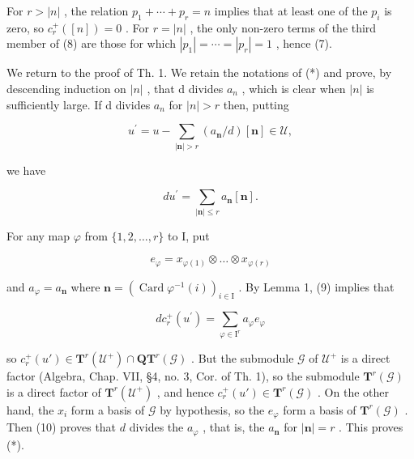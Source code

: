 For \(r > |n|\) , the relation \(p_{1} + \cdots + p_{r} = n\) implies that at least one of the \(p_{i}\) is zero, so \(c_{r}^{+}([n]) = 0\) . For \(r = |n|\) , the only non-zero terms of the third member of (8) are those for which \(|p_{1}| = \cdots = |p_{r}| = 1\) , hence (7).

We return to the proof of Th. 1. We retain the notations of (*) and prove, by descending induction on \(|n|\) , that d divides \(a_{n}\) , which is clear when \(|n|\) is sufficiently large. If d divides \(a_{n}\) for \(|n| > r\) then, putting

\[
u ^ {\prime} = u - \sum_ {| \mathbf {n} | > r} (a _ {\mathbf {n}} / d) [ \mathbf {n} ] \in \mathcal {U},
\]

we have

\[
d u ^ {\prime} = \sum_ {| \mathbf {n} | \leq r} a _ {\mathbf {n}} [ \mathbf {n} ].\tag{9}
\]

For any map \(\varphi\) from \(\{1,2,\ldots,r\}\) to I, put

\[
e _ {\varphi} = x _ {\varphi (1)} \otimes \dots \otimes x _ {\varphi (r)}
\]

and \(a_{\varphi} = a_{\mathbf{n}}\) where \(\mathbf{n} = (\operatorname{Card}\varphi^{-1}(i))_{i\in \mathrm{I}}\) . By Lemma 1, (9) implies that

\[
d c _ {r} ^ {+} (u ^ {\prime}) = \sum_ {\varphi \in \mathrm{I} ^ {r}} a _ {\varphi} e _ {\varphi}\tag{10}
\]

so \(c_r^+(u') \in \mathbf{T}^r(\mathcal{U}^+) \cap \mathbf{Q}\mathbf{T}^r(\mathcal{G})\) . But the submodule \(\mathcal{G}\) of \(\mathcal{U}^+\) is a direct factor (Algebra, Chap. VII, §4, no. 3, Cor. of Th. 1), so the submodule \(\mathbf{T}^r(\mathcal{G})\) is a direct factor of \(\mathbf{T}^r(\mathcal{U}^+)\) , and hence \(c_r^+(u') \in \mathbf{T}^r(\mathcal{G})\) . On the other hand, the \(x_i\) form a basis of \(\mathcal{G}\) by hypothesis, so the \(e_\varphi\) form a basis of \(\mathbf{T}^r(\mathcal{G})\) . Then (10) proves that \(d\) divides the \(a_\varphi\) , that is, the \(a_{\mathbf{n}}\) for \(|\mathbf{n}| = r\) . This proves (*).